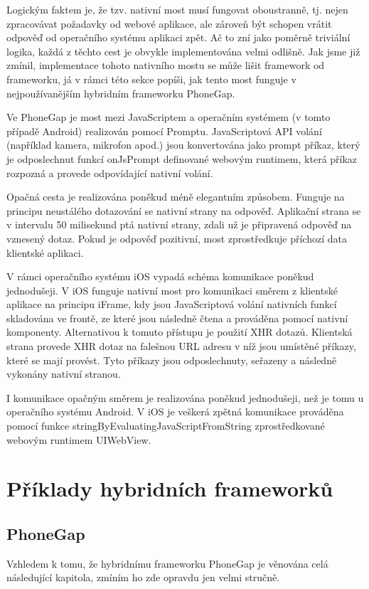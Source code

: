 Logickým faktem je, že tzv. nativní most musí fungovat oboustranně, tj. nejen zpracovávat požadavky od webové aplikace, ale zároveň být schopen vrátit odpověď od operačního systému aplikaci zpět. Ač to zní jako poměrně triviální logika, každá z těchto cest je obvykle implementována velmi odlišně. Jak jsme již zmínil, implementace tohoto nativního mostu se může lišit framework od frameworku, já v rámci této sekce popíši, jak tento most funguje v nejpoužívanějším hybridním frameworku PhoneGap.

Ve PhoneGap je most mezi JavaScriptem a operačním systémem (v tomto případě Android) realizován pomocí Promptu. JavaScriptová API volání (například kamera, mikrofon apod.) jsou konvertována jako prompt příkaz, který je odposlechnut funkcí onJsPrompt definované webovým runtimem, která příkaz rozpozná a provede odpovídající nativní volání. \cite{dissecting_phonegap_architecture} 

Opačná cesta je realizována poněkud méně elegantním způsobem. Funguje na principu neustálého dotazování se nativní strany na odpověď. Aplikační strana se v intervalu 50 milisekund ptá nativní strany, zdali už je připravená odpověď na vznesený dotaz. Pokud je odpověď pozitivní, most zprostředkuje příchozí data klientské aplikaci.

V rámci operačního systému iOS vypadá schéma komunikace poněkud jednodušeji. V iOS funguje nativní most pro komunikaci směrem z klientské aplikace na principu iFrame, kdy jsou JavaScriptová volání nativních funkcí skladována ve frontě, ze které jsou následně čtena a prováděna pomocí nativní komponenty. Alternativou k tomuto přístupu je použití XHR dotazů. Klientská strana provede XHR dotaz na falešnou URL adresu v níž jsou umístěné příkazy, které se mají provést. Tyto příkazy jsou odposlechnuty, seřazeny a následně vykonány nativní stranou. \cite{dissecting_phonegap_architecture}

I komunikace opačným směrem je realizována poněkud jednodušeji, než je tomu u operačního systému Android. V iOS je veškerá zpětná komunikace prováděna pomocí funkce stringByEvaluatingJavaScriptFromString zprostředkované webovým runtimem UIWebView. \cite{dissecting_phonegap_architecture}

\section{Příklady hybridních frameworků}
\subsection{PhoneGap}
Vzhledem k tomu, že hybridnímu frameworku PhoneGap je věnována celá následující kapitola, zmíním ho zde opravdu jen velmi stručně.

